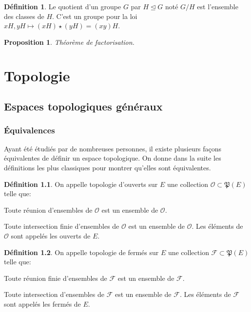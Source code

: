 \documentclass[a4paper, 11pt, french]{book}
\newenvironment{itemise}{\itemize}{\enditemize}
\let\colour=\color
\theoremstyle{plain} %
\newtheorem{proposition}{Proposition}
\theoremstyle{definition} %
\newtheorem{definition}{Définition}
\theoremstyle{remark} %
\newcommand{\1}{\mathds{1}}
\begin{document}
\begin{definition}
	Le quotient d'un groupe $G$ par $H\trianglelefteq G$ noté $G/H$ est l'ensemble des classes de $H$.
	C'est un groupe pour la loi $xH, yH\longmapsto (xH)\star(yH)=(xy)H$.
\end{definition}

\begin{proposition}
	Théorème de factorisation.
	\colour{red}{À compléter !}
\end{proposition}

\part{Topologie}

\chapter{Espaces topologiques généraux}

\section{Équivalences}

Ayant été étudiés par de nombreuses personnes, il existe plusieurs façons équivalentes de définir un espace topologique.
On donne dans la suite les définitions les plus classiques pour montrer qu'elles sont équivalentes.

\begin{definition}
	On appelle topologie d'ouverts sur $E$ une collection $\mathscr{O}\subset\mathfrak{P}(E)$ telle que:
	\begin{itemise}
		\item Toute réunion d'ensembles de $\mathscr{O}$ est un ensemble de $\mathscr{O}$.
		\item Toute intersection finie d'ensembles de $\mathscr{O}$ est un ensemble de $\mathscr{O}$.
	\end{itemise}
	Les éléments de $\mathscr{O}$ sont appelés les ouverts de $E$.
\end{definition}

\begin{definition}
	On appelle topologie de fermés sur $E$ une collection $\mathscr{F}\subset\mathfrak{P}(E)$ telle que:
	\begin{itemise}
		\item Toute réunion finie d'ensembles de $\mathscr{F}$ est un ensemble de $\mathscr{F}$.
		\item Toute intersection d'ensembles de $\mathscr{F}$ est un ensemble de $\mathscr{F}$.
	\end{itemise}
	Les éléments de $\mathscr{F}$ sont appelés les fermés de $E$.
\end{definition}
\end{document}
